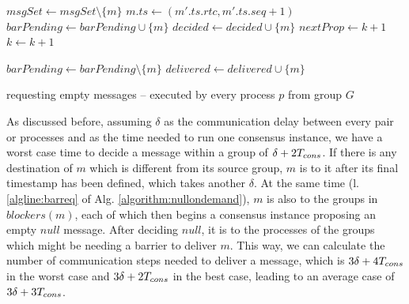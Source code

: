 \documentclass[times, 10pt]{article}
\begin{document}
\begin{algorithm}
\begin{distribalgo}[1]
\blankline
{}
    \STATE $msgSet \leftarrow msgSet \setminus \{m\}$
      \STATE $m.ts \leftarrow (m'.ts.rtc, m'.ts.seq + 1)$ \label{algline:chgts}
    \ENDIF     
     \label{algline:checkcons}
      \STATE $barPending \leftarrow barPending \cup \{m\}$
    \ENDIF
    \STATE $decided \leftarrow decided \cup \{m\}$
      \STATE {} \label{algline:barreq} 
    \ELSE
      \STATE {} 
    \ENDIF
  \ENDINDENT
  \STATE $nextProp \leftarrow k + 1$
  \STATE $k \leftarrow k + 1$
\ENDINDENT

\blankline
{}
  \STATE $barPending \leftarrow barPending \setminus \{m\}$
    \STATE {}
  \ENDIF
  \STATE $delivered \leftarrow delivered \cup \{m\}$

\blankline
\ENDINDENT

\caption{ requesting empty messages -- executed by every process $p$ from group $G$}
\label{algorithm:nullondemand}
\end{distribalgo}
\end{algorithm}
 
As discussed before, assuming $\delta$ as the communication delay between every pair or processes and \tcons{} as the time needed to run one consensus instance, we have a worst case time to decide a message within a group of $\delta + 2T_{cons}$. If there is any destination of $m$ which is different from its source group, $m$ is \rmc{} to it after its final timestamp has been defined, which takes another $\delta$. At the same time (l. \ref{algline:barreq} of Alg. \ref{algorithm:nullondemand}), $m$ is \rmc{} also to the groups in $blockers(m)$, each of which then begins a consensus instance proposing an empty $null$ message. After deciding $null$, it is \rmc{} to the processes of the groups which might be needing a barrier to deliver $m$. This way, we can calculate the number of communication steps needed to deliver a message, which is $3\delta + 4T_{cons}$ in the worst case and $3\delta + 2T_{cons}$ in the best case, leading to an average case of $3\delta + 3T_{cons}$.
\end{document}
